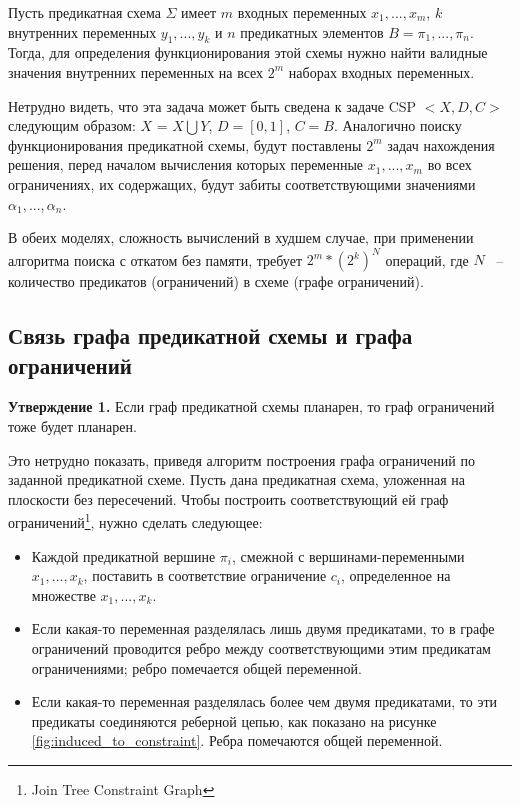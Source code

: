 \documentclass[12pt]{article}
\begin{document}
Пусть предикатная схема $\Sigma$ имеет $m$ входных переменных $x_1, ... , x_m$, 
$k$ внутренних переменных $y_1, ... , y_k$ и $n$ предикатных элементов $B = \pi_1, ... , \pi_n$. 
Тогда, для определения функционирования этой схемы нужно найти валидные значения внутренних переменных на всех $2^{m}$
наборах входных переменных. 

Нетрудно видеть, что эта задача может быть сведена к задаче CSP $<X, D, C>$ следующим образом:
$X$ = $X \bigcup Y$, $D = [0, 1]$, $C = B$. Аналогично поиску функционирования предикатной схемы, 
будут поставлены $2^m$ задач нахождения решения, перед началом вычисления которых переменные $x_1, ... , x_m$ 
во всех ограничениях, их содержащих, будут забиты соответствующими значениями $\alpha_1, ... , \alpha_n$.

В обеих моделях, сложность вычислений в худшем случае, при применении алгоритма поиска 
с откатом без памяти, требует $2^m * (2^k)^N$ операций, где $N$ ~-- количество предикатов (ограничений) 
в схеме (графе ограничений).

\subsection{Связь графа предикатной схемы и графа ограничений}

\textbf{Утверждение 1.} Если граф предикатной схемы планарен, то граф ограничений тоже будет планарен.

Это нетрудно показать, приведя алгоритм построения графа ограничений по заданной предикатной схеме. 
Пусть дана предикатная схема, уложенная на плоскости без пересечений. Чтобы построить соответствующий ей граф
ограничений\footnote{Join Tree Constraint Graph}, нужно сделать следующее:
\begin{itemize}
\item Каждой предикатной вершине $\pi_i$, смежной с вершинами-переменными $x_1, ... , x_k$, поставить в соответствие
ограничение $c_i$, определенное на множестве $x_1, ..., x_k$.
\item Если какая-то переменная разделялась лишь двумя предикатами, то в графе ограничений
проводится ребро между соответствующими этим предикатам ограничениями; ребро помечается общей переменной.
\item Если какая-то переменная разделялась более чем двумя предикатами, то эти предикаты соединяются 
реберной цепью, как показано на рисунке \ref{fig:induced_to_constraint}. Ребра помечаются общей переменной.
\end{itemize}
\end{document}
